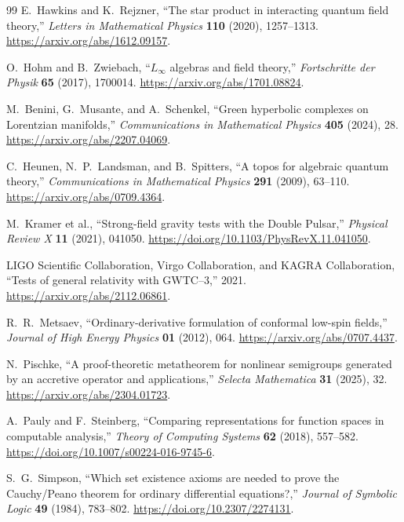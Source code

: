 \documentclass[11pt]{article}
\theoremstyle{definition}
\theoremstyle{remark}
\begin{document}
\begin{thebibliography}{99}
E.~Hawkins and K.~Rejzner,
``The star product in interacting quantum field theory,''
\emph{Letters in Mathematical Physics} \textbf{110} (2020), 1257--1313.
\url{https://arxiv.org/abs/1612.09157}.

O.~Hohm and B.~Zwiebach,
``$L_\infty$ algebras and field theory,''
\emph{Fortschritte der Physik} \textbf{65} (2017), 1700014.
\url{https://arxiv.org/abs/1701.08824}.

M.~Benini, G.~Musante, and A.~Schenkel,
``Green hyperbolic complexes on Lorentzian manifolds,''
\emph{Communications in Mathematical Physics} \textbf{405} (2024), 28.
\url{https://arxiv.org/abs/2207.04069}.

C.~Heunen, N.~P.~Landsman, and B.~Spitters,
``A topos for algebraic quantum theory,''
\emph{Communications in Mathematical Physics} \textbf{291} (2009), 63--110.
\url{https://arxiv.org/abs/0709.4364}.

M.~Kramer et al.,
``Strong-field gravity tests with the Double Pulsar,''
\emph{Physical Review X} \textbf{11} (2021), 041050.
\url{https://doi.org/10.1103/PhysRevX.11.041050}.

LIGO Scientific Collaboration, Virgo Collaboration, and KAGRA Collaboration,
``Tests of general relativity with GWTC--3,'' 2021.
\url{https://arxiv.org/abs/2112.06861}.

R.~R.~Metsaev,
``Ordinary-derivative formulation of conformal low-spin fields,''
\emph{Journal of High Energy Physics} \textbf{01} (2012), 064.
\url{https://arxiv.org/abs/0707.4437}.

N.~Pischke,
``A proof-theoretic metatheorem for nonlinear semigroups generated by an
accretive operator and applications,''
\emph{Selecta Mathematica} \textbf{31} (2025), 32.
\url{https://arxiv.org/abs/2304.01723}.

A.~Pauly and F.~Steinberg,
``Comparing representations for function spaces in computable analysis,''
\emph{Theory of Computing Systems} \textbf{62} (2018), 557--582.
\url{https://doi.org/10.1007/s00224-016-9745-6}.

S.~G.~Simpson,
``Which set existence axioms are needed to prove the Cauchy/Peano theorem for
ordinary differential equations?,''
\emph{Journal of Symbolic Logic} \textbf{49} (1984), 783--802.
\url{https://doi.org/10.2307/2274131}.


\end{thebibliography}
\end{document}
